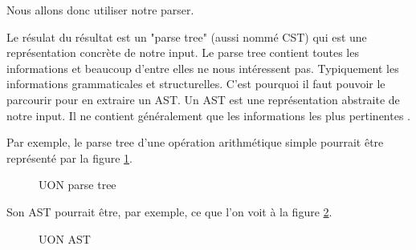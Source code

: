 \documentclass[
    iict, %
    il, %
]{heig-tb}
\begin{document}
Nous allons donc utiliser notre parser.

Le résulat du résultat est un "parse tree" (aussi nommé CST) qui est une représentation concrète de notre input.
Le parse tree contient toutes les informations et beaucoup d'entre elles ne nous intéressent pas.
Typiquement les informations grammaticales et structurelles.
C'est pourquoi il faut pouvoir le parcourir pour en extraire un AST.
Un AST est une représentation abstraite de notre input. Il ne contient généralement que les informations les plus pertinentes \cite{cst}.

Par exemple, le parse tree d'une opération arithmétique simple pourrait être représenté par la figure \ref{parse-tree}.

\begin{figure}[!h]
    \begin{center}
    \end{center}
    \caption[Exemple d'un parse tree]{\label{parse-tree} UON parse tree}
\end{figure}

Son AST pourrait être, par exemple, ce que l'on voit à la figure \ref{ast}.

\begin{figure}[!h]
    \begin{center}
    \end{center}
    \caption[Exemple d'un AST]{\label{ast} UON AST}
\end{figure}
\end{document}
